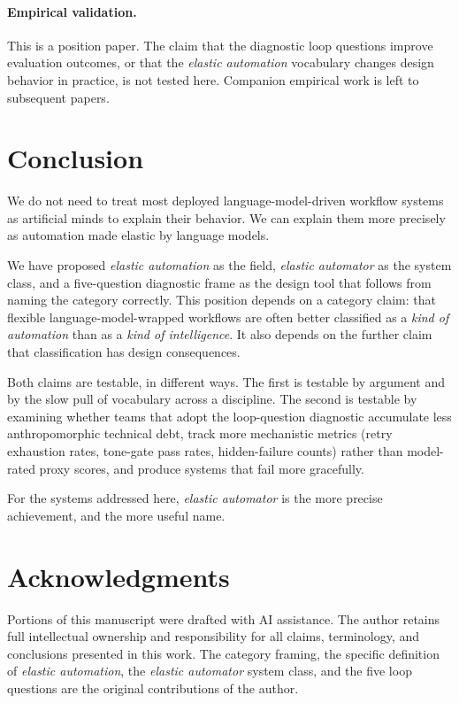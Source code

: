 \documentclass[11pt,a4paper]{article}
\begin{document}
\paragraph{Empirical validation.} This is a position paper. The claim that the diagnostic loop questions improve evaluation outcomes, or that the \textit{elastic automation} vocabulary changes design behavior in practice, is not tested here. Companion empirical work is left to subsequent papers.

\section{Conclusion}\label{sec:conclusion}

We do not need to treat most deployed language-model-driven workflow systems as artificial minds to explain their behavior. We can explain them more precisely as automation made elastic by language models.

We have proposed \textit{elastic automation} as the field, \textit{elastic automator} as the system class, and a five-question diagnostic frame as the design tool that follows from naming the category correctly. This position depends on a category claim: that flexible language-model-wrapped workflows are often better classified as a \textit{kind of automation} than as a \textit{kind of intelligence}. It also depends on the further claim that classification has design consequences.

Both claims are testable, in different ways. The first is testable by argument and by the slow pull of vocabulary across a discipline. The second is testable by examining whether teams that adopt the loop-question diagnostic accumulate less anthropomorphic technical debt, track more mechanistic metrics (retry exhaustion rates, tone-gate pass rates, hidden-failure counts) rather than model-rated proxy scores, and produce systems that fail more gracefully.

For the systems addressed here, \textit{elastic automator} is the more precise achievement, and the more useful name.

\section*{Acknowledgments}

Portions of this manuscript were drafted with AI assistance. The author retains full intellectual ownership and responsibility for all claims, terminology, and conclusions presented in this work. The category framing, the specific definition of \textit{elastic automation}, the \textit{elastic automator} system class, and the five loop questions are the original contributions of the author.
\end{document}
